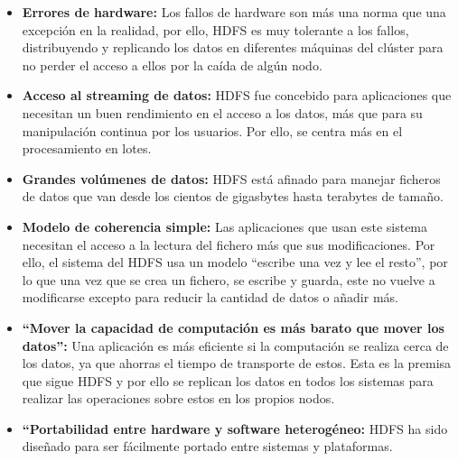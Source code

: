 \begin{itemize}
\item \textbf{Errores de hardware:} Los fallos de hardware son más una norma que una excepción en la realidad, por ello, \gls{HDFS} es muy tolerante a los fallos, distribuyendo y replicando los datos en diferentes máquinas del clúster para no perder el acceso a ellos por la caída de algún nodo.

\item \textbf{Acceso al streaming de datos:} \gls{HDFS} fue concebido para aplicaciones que necesitan un buen rendimiento en el acceso a los datos, más que para su manipulación continua por los usuarios. Por ello, se centra más en el procesamiento en lotes.

\item \textbf{Grandes volúmenes de datos:} \gls{HDFS} está afinado para manejar ficheros de datos que van desde los cientos de gigasbytes hasta terabytes de tamaño.

\item \textbf{Modelo de coherencia simple:} Las aplicaciones que usan este sistema necesitan el acceso a la lectura del fichero más que sus modificaciones. Por ello, el sistema del \gls{HDFS} usa un modelo ``escribe una vez y lee el resto'', por lo que una vez que se crea un fichero, se escribe y guarda, este no vuelve a modificarse excepto para reducir la cantidad de datos o añadir más.

\item \textbf{``Mover la capacidad de computación es más barato que mover los datos'':} Una aplicación es más eficiente si la computación se realiza cerca de los datos, ya que ahorras el tiempo de transporte de estos. Esta es la premisa que sigue \gls{HDFS} y por ello se replican los datos en todos los sistemas para realizar las operaciones sobre estos en los propios nodos.

\item \textbf{``Portabilidad entre hardware y software heterogéneo: } \gls{HDFS} ha sido diseñado para ser fácilmente portado entre sistemas y plataformas.
\end{itemize}

